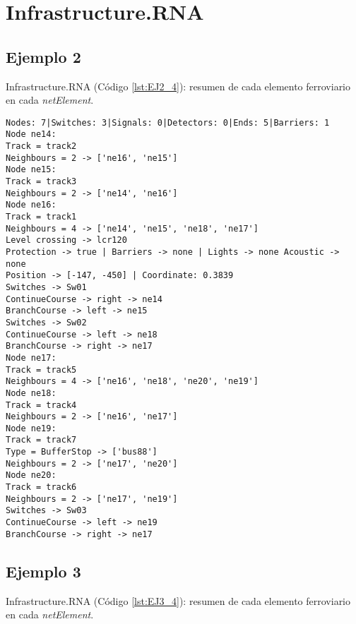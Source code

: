 \chapter{Infrastructure.RNA}
	\label{sec:infrastructureRNA}
		
	\section{Ejemplo 2}
	Infrastructure.RNA (Código \ref{lst:EJ2_4}): resumen de cada elemento ferroviario en cada \textit{netElement}.
	
	\begin{lstlisting}[language = {}, caption = Infrastructure.RNA, label = {lst:EJ2_4}]
Nodes: 7|Switches: 3|Signals: 0|Detectors: 0|Ends: 5|Barriers: 1
Node ne14:
Track = track2
Neighbours = 2 -> ['ne16', 'ne15']
Node ne15:
Track = track3
Neighbours = 2 -> ['ne14', 'ne16']
Node ne16:
Track = track1
Neighbours = 4 -> ['ne14', 'ne15', 'ne18', 'ne17']
Level crossing -> lcr120
Protection -> true | Barriers -> none | Lights -> none Acoustic -> none
Position -> [-147, -450] | Coordinate: 0.3839
Switches -> Sw01
ContinueCourse -> right -> ne14
BranchCourse -> left -> ne15
Switches -> Sw02
ContinueCourse -> left -> ne18
BranchCourse -> right -> ne17
Node ne17:
Track = track5
Neighbours = 4 -> ['ne16', 'ne18', 'ne20', 'ne19']
Node ne18:
Track = track4
Neighbours = 2 -> ['ne16', 'ne17']
Node ne19:
Track = track7
Type = BufferStop -> ['bus88']
Neighbours = 2 -> ['ne17', 'ne20']
Node ne20:
Track = track6
Neighbours = 2 -> ['ne17', 'ne19']
Switches -> Sw03
ContinueCourse -> left -> ne19
BranchCourse -> right -> ne17
	\end{lstlisting}
	\section{Ejemplo 3}
	Infrastructure.RNA (Código \ref{lst:EJ3_4}): resumen de cada elemento ferroviario en cada \textit{netElement}.
	

